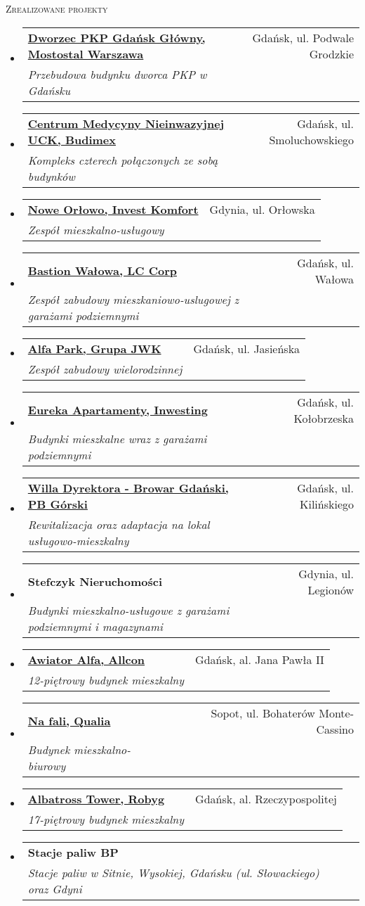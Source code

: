 \documentclass[letterpaper,11pt]{article}
\makeatletter
\newcommand{\resheading}[1]{
  \begin{tcolorbox}
  \textsc{#1}
  \end{tcolorbox}
}
\newcommand{\ressubheading}[4]{
\begin{tabular*}{6.5in}{l@{\extracolsep{\fill}}r}
		\textbf{#1} & #2 \\
		\textit{#3} & \textit{#4} \\
\end{tabular*}\vspace{-6pt}}
\makeatother
\begin{document}
\resheading{Zrealizowane projekty}
\begin{itemize}

\item
  \ressubheading{\href{https://www.mostostal.waw.pl/realizacje/ogolne/przebudowa-dworca-pkp-gdansk-glowny}{Dworzec PKP Gdańsk Główny, Mostostal Warszawa}}{Gdańsk, ul. Podwale Grodzkie}{Przebudowa budynku dworca PKP w Gdańsku}{}

\item
  \ressubheading{\href{https://www.urbanity.pl/pomorskie/gdansk/centrum-medycyny-nieinwazyjnej,b4155}{Centrum Medycyny Nieinwazyjnej UCK, Budimex}}{Gdańsk, ul. Smoluchowskiego}{Kompleks czterech połączonych ze sobą budynków}{}

\item
  \ressubheading{\href{https://www.investkomfort.pl/mieszkania-gdynia/nowe-orlowo/}{Nowe Orłowo, Invest Komfort}}{Gdynia, ul. Orłowska}{Zespół mieszkalno-usługowy}{} 
  
\item
  \ressubheading{\href{https://www.ndi.pl/en/bastion-walowa}{Bastion Wałowa, LC Corp}}{Gdańsk, ul. Wałowa}{Zespół zabudowy mieszkaniowo-uslugowej z garażami podziemnymi}{}

\item
  \ressubheading{\href{https://alfapark.pl}{Alfa Park, Grupa JWK}}{Gdańsk, ul. Jasieńska}{Zespół zabudowy wielorodzinnej}{}

\item
  \ressubheading{\href{http://eurekaapartamenty.pl/}{Eureka Apartamenty, Inwesting}}{Gdańsk, ul. Kołobrzeska}{Budynki mieszkalne wraz z garażami podziemnymi}{}

\item
  \ressubheading{\href{http://www.browargdanski.pl}{Willa Dyrektora - Browar Gdański, PB Górski}}{Gdańsk, ul. Kilińskiego}{Rewitalizacja oraz adaptacja na lokal usługowo-mieszkalny}{}

\item
  \ressubheading{Stefczyk Nieruchomości}{Gdynia, ul. Legionów}{Budynki mieszkalno-usługowe z garażami podziemnymi i magazynami}{}
  
\item
  \ressubheading{\href{https://www.allcon.pl/mieszkania/apartamenty/awiator}{Awiator Alfa, Allcon}}{Gdańsk, al. Jana Pawła II}{12-piętrowy budynek mieszkalny}{}

\item
  \ressubheading{\href{https://dom.trojmiasto.pl/Na-Fali-i310.html}{Na fali, Qualia}}{Sopot, ul. Bohaterów Monte-Cassino}{Budynek mieszkalno-biurowy}{}

\item
  \ressubheading{\href{https://www.gdansk.robyg.pl/oferta/mieszkania/albatross-towers}{Albatross Tower, Robyg}}{Gdańsk, al. Rzeczypospolitej}{17-piętrowy budynek mieszkalny}{}

\item
  \ressubheading{Stacje paliw BP}{}{Stacje paliw w Sitnie, Wysokiej, Gdańsku (ul. Słowackiego) oraz Gdyni}{}

\end{itemize}
\end{document}
